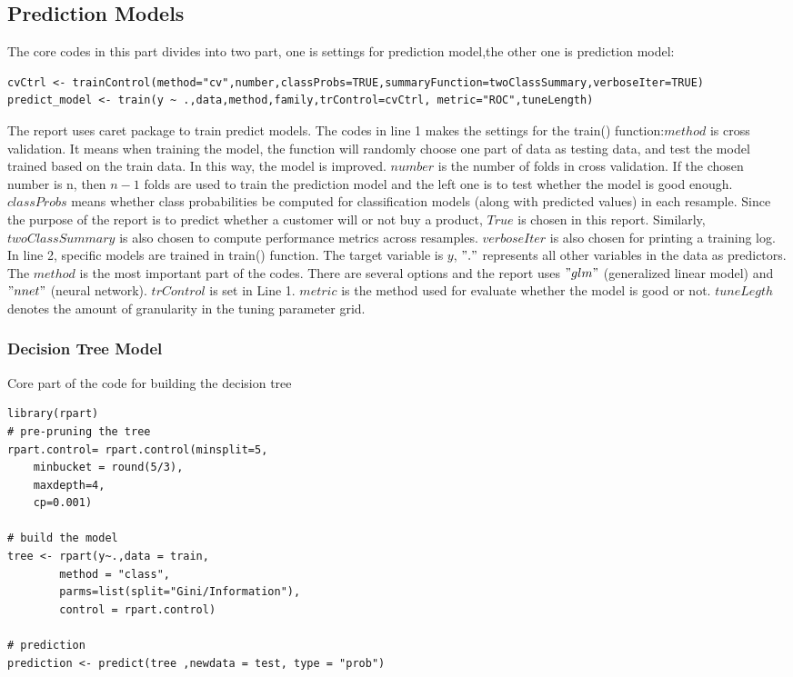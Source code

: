     \subsection{Prediction Models}
    \noindent The core codes in this part divides into two part, one is settings for prediction model,the other one is prediction model: 
   \begin{lstlisting}
cvCtrl <- trainControl(method="cv",number,classProbs=TRUE,summaryFunction=twoClassSummary,verboseIter=TRUE)
predict_model <- train(y ~ .,data,method,family,trControl=cvCtrl, metric="ROC",tuneLength)
    \end{lstlisting}
    \indent The report uses caret package to train predict models. The codes in line 1 makes the settings for the train() function:$method$ is cross validation. It means when training the model, the function will randomly choose one part of data as testing data, and test the model trained based on the train data. In this way, the model is improved. $number$ is the number of folds in cross validation. If the chosen number is n, then $n-1$ folds are used to train the prediction model and the left one is to test whether the model is good enough.  $classProbs$ means whether class probabilities be computed for classification models (along with predicted values) in each resample. Since the purpose of the report is to predict whether a customer will or not buy a product, $True$ is chosen in this report. Similarly, $twoClassSummary$ is also chosen to compute performance metrics across resamples. $verboseIter$ is also chosen for printing a training log.\\
    [\baselineskip]\indent In line 2, specific models are trained in train() function. The target variable is $y$, $"."$ represents all other variables in the data as predictors. The $method$ is the most important part of the codes. There are several options and the report uses $"glm"$ (generalized linear model) and $"nnet"$ (neural network). $trControl$ is set in Line 1. $metric$ is the method used for evaluate whether the model is good or not. $tuneLegth$ denotes the amount of granularity in the tuning parameter grid.  \\
    \subsubsection{Decision Tree Model}
    \noindent Core part of the code for building the decision tree
    \begin{lstlisting}
library(rpart)
# pre-pruning the tree
rpart.control= rpart.control(minsplit=5, 
	minbucket = round(5/3),
	maxdepth=4, 
	cp=0.001)
   
# build the model
tree <- rpart(y~.,data = train,
		method = "class", 
	   	parms=list(split="Gini/Information"), 
	   	control = rpart.control)

# prediction
prediction <- predict(tree ,newdata = test, type = "prob")
    
    \end{lstlisting}

